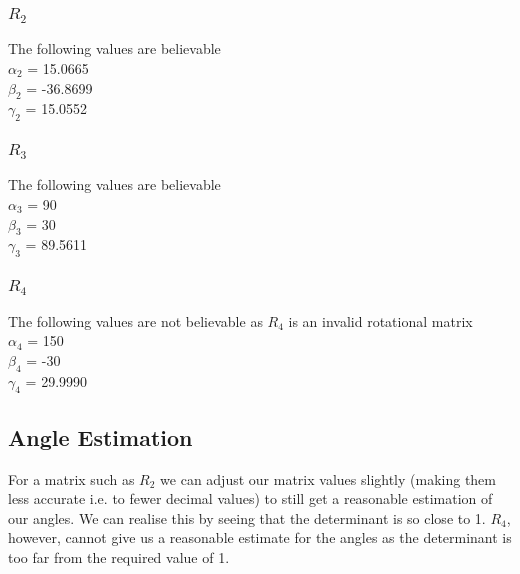 		\subsubsection{$R_{2}$}
		The following values are believable\\
			$\alpha_{2}$ = 15.0665\degree\\
			$\beta_{2}$ = -36.8699\degree\\
			$\gamma_{2}$ = 15.0552\degree\\
		\subsubsection{$R_{3}$}
		The following values are believable\\
			$\alpha_{3}$ = 90\degree\\
			$\beta_{3}$ = 30\degree\\
			$\gamma_{3}$ = 89.5611\degree\\
		\subsubsection{$R_{4}$}
		The following values are not believable as $R_{4}$ is an invalid rotational matrix\\
			$\alpha_{4}$ = 150\degree\\
			$\beta_{4}$ = -30\degree\\
			$\gamma_{4}$ = 29.9990\degree\\
	\subsection{Angle Estimation}
	For a matrix such as $R_{2}$ we can adjust our matrix values slightly (making them less accurate i.e. to fewer decimal values) to still get a reasonable estimation of our angles. We can realise this by seeing that the determinant is so close to 1.
	$R_{4}$, however, cannot give us a reasonable estimate for the angles as the determinant is too far from the required value of 1.
